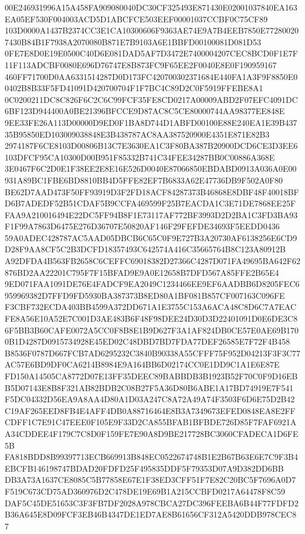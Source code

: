 \documentclass[UTF8,fontset=fandol,zihao=-4,a4paper]{ctexart}
\begin{document}
{{00E246931996A15A458FA909080040DC30CF325493E871430E02001037840EA163EA05EF530F004003ACD5D1ABCFCE503EEF00001037CCBF0C75CF89
103D0000A1437B2374CC3E1CA10300606F9363AE74E9A7B4EEB7850E772800207430B84B1F7938A2070080B871E7B9103A6E1BBFD00100081D081D53
0FE7E8D0E19E0500C40D6E081DAD5AF7D3472E7400004207CEC8BCD0F1E7F11F113ADCBF0080E696D76747E8B873FC9F65EE2F0040E8E0F190959167
460FF71700D0AA6331514287D0D173FC420700302371684E440FA1A3F9F8850E00402B8B33F5FD41091D420700704F1F7BC4C89D2C0F5919FFEBE8A1
0C0200211DC8C826F6C2C6C99FCF35FE8CD0217A00009ABD2F07EFC4091DC6BF123D944400A0BE21396BFCCE9D87AC8C5CE80000744AA98377EE848E
9EE33FE26A113D00000D9ED0F1BA8D744D1ABFD00100E88E240EA1E39B43735B95850ED103009038848E3B438787AC8AA387520900E4351E871E82B3
2974187F6CE8103D00806B13C7E3630EA1C3F80BA387B20900DCD6CE3D3EE6103DFCF95CA10300D00B951F85332B741C34FEE34287BB0C00886A368E
3E0467F6C2D0E1F38EE2E8E16E526D0040E87066850EBDABD0913A036A0E00931A89BC1FBE6BD8810BB4D5FFE82EF7B6833A62E47736DB9F502A0F80
BE62D7AAD473F50FF93919D3F2FD18ACF84287373B46868E8DBF48F40018BFD6B7ADEDF52B51CDAF5B9CCFA469599F25B7EACDA1C3E71DE7868EE25F
FAA9A210016494E22DC5FF94B8F1E73117AF772BF3993D2D2BA1C3FD3BA93F1F99A7863D6475E276D36707E50820AF146F29FEFDE34693F5EEDD0436
59A0ADEC428787AC5AAD05DBCB6C65C0F9E727B3A20730AF6138256E6CD9D28F9AA8CF5C2B3DCFD18357493C642574A416C35665764B8C123A80912B
A92DFDA4B563FB2658C6CEFFC69018382D27366C4287D071FA49695BA642F62876BD2AA22201C795F7F15BFAD9E9A0E12658B7DFD567A85FFE2B65E4
9ED071FAA1091DE76E4FADCF9EA2049C1234466EE9EF6AADBB6D8205FEC6959969382D7FFD9FD5930BA387373B8ED80A1BF081B857CF007163C096FE
F3CBF732ECDA403BB4599A372DD671A1E3755C153A6ACA48C8D6C7A7EACFE8A56E10A52E7C001D3AE483B6F48F98DEE24D30D3D22401091D0E6DE3C8
6F5BB3B60CAFE0072A5CC0F8B8E1B9D627F3A1AF824DB0CE57E0AE69B1700B1D4287D0915734928E45ED02C48DBD7BD7FDA77DEF26585E7F72F4B458
B8536F0787D667FCB7AD6295232C3840B90338A55CFFF75F952D04213F3F3C77AC57E6BD9DF0CA6214B8984E9A164BB6D02174CC0E1DD9C1A1E6E87E
FD150A14505CA8772D07E13FF35DEEC89BABBDB3B1923B52F70C0F9D16EBB5D07143E8B8F321AB82BDB2C08B27F5A36D80B6ABE1A17BD74919E7F541
F5DC04332D56EA9A8AA4D80A1D03A247C8A72A49A74F3503F6D6E75D2B42C19AF265EED8FB4E4AFF4DB0A88716464E8B3A7349673EFED0848EA8E2FF
CDFF1C7E91C47EEE0F105E9F33D2CA855BFAB1BFBDE726D85F7FAF6921AA34CDDEE4F179C7C8D0F159FE7E90A8D9BE217728BC3060CFADECA1D6FE5B
FA818BDD8B99397713ECB669913B848EC0522674748B1E2B67B63E6E7C9F3B4EBCFB146198747BDAD20FDFD25F495835DDF5F79353D07A9D382DD6BB
DB3A73A1637CE8085C5B77858E67E1F38ED3CFF51F7E82C20BC5F7696A0D7F519C673CD75AD360976D2C478DE19E69B1A215CCBFD0217A64478F8C59
DAF5C45DE51653C3F3FB7DF2028A978CBCA27DC396FEEBA6B44F77FDFD2B36A645E8D09FCF3EB46B4347DE1ED7AE8B61656CF312A5420DDB978CEC87
}}
\end{document}
